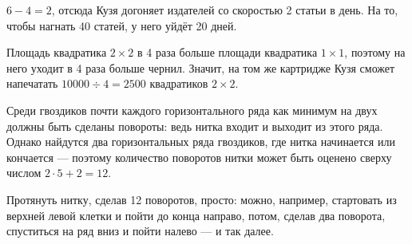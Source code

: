 \begin{itemize}

\itA $6-4=2$, отсюда Кузя догоняет издателей со скоростью 2 статьи в день. На то, чтобы нагнать 40 статей, у него уйдёт 20 дней.

\itB Площадь квадратика $2 \times 2$ в 4 раза больше площади квадратика $1 \times 1$, поэтому на него уходит в 4 раза больше чернил. Значит, на том же картридже Кузя сможет напечатать $10000 \div 4 = 2500$ квадратиков $2 \times 2$.

\itC Среди гвоздиков почти каждого горизонтального ряда как минимум на двух должны быть сделаны повороты: ведь нитка входит и выходит из этого ряда. Однако найдутся два горизонтальных ряда гвоздиков, где нитка начинается или кончается — поэтому количество поворотов нитки может быть оценено сверху числом $2 \cdot 5 + 2 =12$.

Протянуть нитку, сделав 12 поворотов, просто: можно, например, стартовать из верхней левой клетки и пойти до конца направо, потом, сделав два поворота, спуститься на ряд вниз и пойти налево — и так далее.
\end{itemize}
